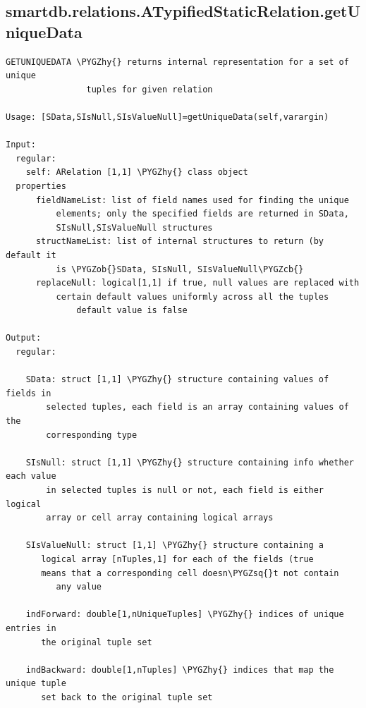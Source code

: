 \documentclass[letterpaper,10pt,english]{sphinxmanual}
\def\PYGZob{\char`\{}
\def\PYGZcb{\char`\}}
\def\PYGZhy{\char`\-}
\def\PYGZsq{\char`\'}
\begin{document}
\subsection{smartdb.relations.ATypifiedStaticRelation.getUniqueData}
\label{chap_functions:smartdb-relations-atypifiedstaticrelation-getuniquedata}
\begin{Verbatim}[commandchars=\\\{\}]
GETUNIQUEDATA \PYGZhy{} returns internal representation for a set of unique
                tuples for given relation

Usage: [SData,SIsNull,SIsValueNull]=getUniqueData(self,varargin)

Input:
  regular:
    self: ARelation [1,1] \PYGZhy{} class object
  properties
      fieldNameList: list of field names used for finding the unique
          elements; only the specified fields are returned in SData,
          SIsNull,SIsValueNull structures
      structNameList: list of internal structures to return (by default it
          is \PYGZob{}SData, SIsNull, SIsValueNull\PYGZcb{}
      replaceNull: logical[1,1] if true, null values are replaced with
          certain default values uniformly across all the tuples
              default value is false

Output:
  regular:

    SData: struct [1,1] \PYGZhy{} structure containing values of fields in
        selected tuples, each field is an array containing values of the
        corresponding type

    SIsNull: struct [1,1] \PYGZhy{} structure containing info whether each value
        in selected tuples is null or not, each field is either logical
        array or cell array containing logical arrays

    SIsValueNull: struct [1,1] \PYGZhy{} structure containing a
       logical array [nTuples,1] for each of the fields (true
       means that a corresponding cell doesn\PYGZsq{}t not contain
          any value

    indForward: double[1,nUniqueTuples] \PYGZhy{} indices of unique entries in
       the original tuple set

    indBackward: double[1,nTuples] \PYGZhy{} indices that map the unique tuple
       set back to the original tuple set
\end{Verbatim}
\end{document}
